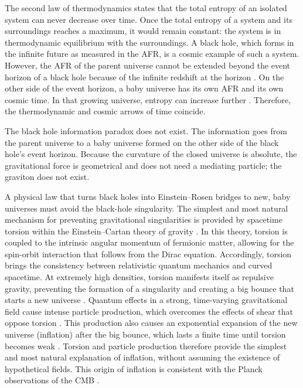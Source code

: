 \documentclass[prd,onecolumn,nofootinbib]{revtex4}
\begin{document}
The second law of thermodynamics states that the total entropy of an isolated system can never decrease over time.
Once the total entropy of a system and its surroundings reaches a maximum, it would remain constant: the system is in thermodynamic equilibrium with the surroundings.
A black hole, which forms in the infinite future as measured in the AFR, is a cosmic example of such a system.
However, the AFR of the parent universe cannot be extended beyond the event horizon of a black hole because of the infinite redshift at the horizon \cite{LL2}.
On the other side of the event horizon, a baby universe has its own AFR and its own cosmic time.
In that growing universe, entropy can increase further \cite{ApJ}.
Therefore, the thermodynamic and cosmic arrows of time coincide.

The black hole information paradox does not exist.
The information goes from the parent universe to a baby universe formed on the other side of the black hole's event horizon.
Because the curvature of the closed universe is absolute, the gravitational force is geometrical and does not need a mediating particle; the graviton does not exist.

A physical law that turns black holes into Einstein--Rosen bridges to new, baby universes must avoid the black-hole singularity.
The simplest and most natural mechanism for preventing gravitational singularities is provided by spacetime torsion within the Einstein--Cartan theory of gravity \cite{Newton,EC}.
In this theory, torsion is coupled to the intrinsic angular momentum of fermionic matter, allowing for the spin-orbit interaction that follows from the Dirac equation.
Accordingly, torsion brings the consistency between relativistic quantum mechanics and curved spacetime.
At extremely high densities, torsion manifests itself as repulsive gravity, preventing the formation of a singularity and creating a big bounce that starts a new universe \cite{ApJ,avert}.
Quantum effects in a strong, time-varying gravitational field cause intense particle production, which overcomes the effects of shear that oppose torsion \cite{shear}.
This production also causes an exponential expansion of the new universe (inflation) after the big bounce, which lasts a finite time until torsion becomes weak \cite{ApJ}.
Torsion and particle production therefore provide the simplest and most natural explanation of inflation, without assuming the existence of hypothetical fields.
This origin of inflation is consistent with the Planck observations of the CMB \cite{obs}.
\end{document}
